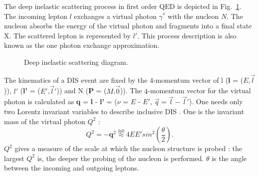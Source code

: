 The deep inelastic scattering process in first order QED is depicted in Fig.~\ref{pic:DIS}. The incoming lepton $l$ exchanges a virtual photon $\gamma^*$ with the nucleon $N$. The nucleon absorbs the energy of the virtual photon and fragments into a final state X. The scattered lepton is represented by $l'$. This process description is also known as the one photon exchange approximation.

\begin{figure}[!h]
  \centering

	\caption{Deep inelastic scattering diagram.}
	\label{pic:DIS}
\end{figure}

The kinematics of a DIS event are fixed by the $4$-momentum vector of l (\textbf{l} = ($E$,$\vec{l}$)), $l'$ (\textbf{l'} = ($E'$,$\vec{l}'$)) and N (\textbf{P} = ($M$,$\vec{0}$)). The $4$-momentum vector for the virtual photon is calculated as \textbf{q} = \textbf{l} - \textbf{l'} = ($\nu$ = $E$ - $E'$, $\vec{q}=\vec{l}-\vec{l}'$). One needs only two Lorentz invariant variables to describe inclusive DIS \cite{DISmeas}. One is the invariant mass of the virtual photon $Q^2$ :
%
\begin{equation}
  Q^2 = -\textbf{q}^2 \stackrel{lab}{\approx} 4EE'sin^2\left(\frac{\theta}{2}\right).
\end{equation}
%
$Q^2$ gives a measure of the scale at which the nucleon structure is probed : the largest $Q^2$ is, the deeper the probing of the nucleon is performed. $\theta$ is the angle between the incoming and outgoing leptons.

